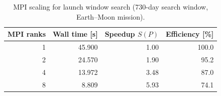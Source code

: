 \begin{table}[htbp]
\centering
\caption{MPI scaling for launch window search (730-day search window, Earth--Moon mission).}
\label{tab:mpi}
\begin{tabular}{rrrr}
\toprule
MPI ranks & Wall time [s] & Speedup $S(P)$ & Efficiency [\%] \\
\midrule
1 & 45.900 & 1.00 & 100.0 \\
2 & 24.570 & 1.90 & 95.2 \\
4 & 13.972 & 3.48 & 87.0 \\
8 & 8.809 & 5.93 & 74.1 \\
\bottomrule
\end{tabular}
\end{table}